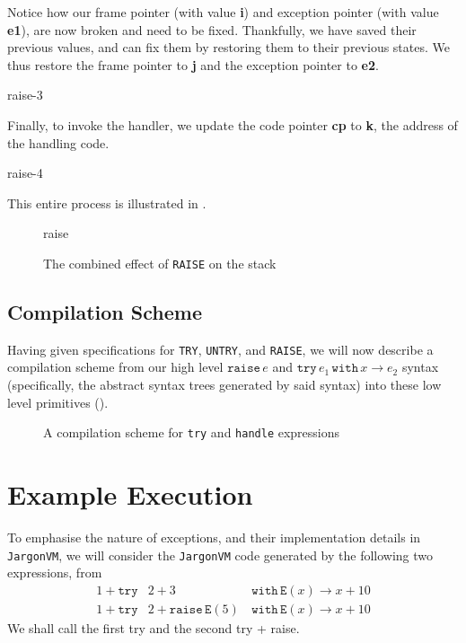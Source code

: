 Notice how our frame pointer (with value \textbf{i}) and exception pointer (with value \textbf{e1}), are now broken and need to be fixed. Thankfully, we have saved their previous values, and can fix them by restoring them to their previous states. We thus restore the frame pointer to \textbf{j} and the exception pointer to \textbf{e2}. 

\begin{center}
    {raise-3}
\end{center}

Finally, to invoke the handler, we update the code pointer \textbf{cp} to \textbf{k}, the address of the handling code. 

\begin{center}
    {raise-4}
\end{center}

This entire process is illustrated in .

\begin{figure}[H]
    \centering
    {raise}
    \caption{The combined effect of \texttt{RAISE} on the stack}
    \label{fig:raise-specification}
\end{figure}

\subsection{Compilation Scheme}
Having given specifications for \texttt{TRY}, \texttt{UNTRY}, and \texttt{RAISE}, we will now describe a compilation scheme from our high level $\texttt{raise} \, e$ and $\texttt{try} \, e_1 \, \texttt{with} \, x \to e_2$ syntax (specifically, the abstract syntax trees generated by said syntax) into these low level primitives (). 

\begin{figure}[H]
    \centering
    \caption{A compilation scheme for \texttt{try} and \texttt{handle} expressions}
    \label{fig:exception-compilation-scheme}
\end{figure}

\section{Example Execution}
To emphasise the nature of exceptions, and their implementation details in \texttt{JargonVM}, we will consider the \texttt{JargonVM} code generated by the following two expressions, from 
\[\begin{array}{rrc}
     1+\texttt{try}& 2+3\, & \texttt{with} \, \texttt{E}(x) \to x+10  \\
     1+\texttt{try}& 2+\texttt{raise}\, \texttt{E}(5)\, & \texttt{with} \, \texttt{E}(x) \to x+10
\end{array} \]
We shall call the first \textsf{try} and the second \textsf{try + raise}.

